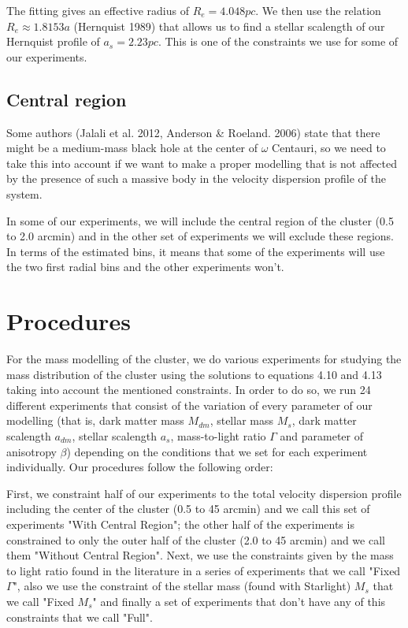 The fitting gives an effective radius of $R_{e}=4.048pc$. We then use the relation $R_{e}\approx1.8153a$ (Hernquist 1989) that allows us to find a stellar scalength of our Hernquist profile of $a_{s}=2.23pc$. This is one of the constraints we use for some of our experiments.

\subsection{Central region}

Some authors (Jalali et al. 2012, Anderson \& Roeland. 2006) state that there might be a medium-mass black hole at the center of $\omega$ Centauri, so we need to take this into account if we want to make a proper modelling that is not affected by the presence of such a massive body in the velocity dispersion profile of the system.

In some of our experiments, we will include the central region of the cluster (0.5 to 2.0 arcmin) and in the other set of experiments we will exclude these regions. In terms of the estimated bins, it means that some of the experiments will use the two first radial bins and the other experiments won't. 

\section{Procedures}

For the mass modelling of the cluster, we do various experiments for studying the mass distribution of the cluster using the solutions to equations 4.10 and 4.13 taking into account the mentioned constraints. In order to do so, we run 24 different experiments that consist of the variation of every parameter of our modelling (that is, dark matter mass $M_{dm}$, stellar mass $M_{s}$, dark matter scalength $a_{dm}$, stellar scalength $a_{s}$, mass-to-light ratio $\Gamma$ and parameter of anisotropy $\beta$) depending on the conditions that we set for each experiment individually. Our procedures follow the following order:

First, we constraint half of our experiments to the total velocity dispersion profile including the center of the cluster (0.5 to 45 arcmin) and we call this set of experiments "With Central Region"; the other half of the experiments is constrained to only the outer half of the cluster (2.0 to 45 arcmin) and we call them "Without Central Region". Next, we use the constraints given by the mass to light ratio found in the literature in a series of experiments that we call "Fixed $\Gamma$", also we use the constraint of the stellar mass (found with Starlight) $M_s$ that we call "Fixed $M_s$" and finally a set of experiments that don't have any of this constraints that we call "Full".

